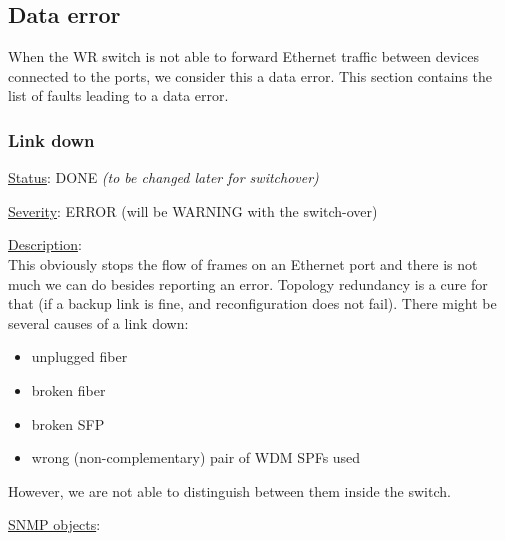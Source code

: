 \newpage
\subsection{Data error}
When the WR switch is not able to forward Ethernet traffic between devices
connected to the ports, we consider this a data error. This section contains the
list of faults leading to a data error.

\subsubsection{\bf Link down}
		\label{fail:data:link_down}
		\begin{pck_descr}
			\item [] \underline{Status}: DONE  \emph{(to be changed later for switchover)}
			\item [] \underline{Severity}: ERROR (will be WARNING with the
				switch-over)
			\item [] \underline{Description}:\\
				This obviously stops the flow of frames on an Ethernet port and there is
				not much we can do besides reporting an error. Topology redundancy is a
				cure for that (if a backup link is fine, and reconfiguration does not
				fail). There might be several causes of a link down:
				\begin{itemize}
					\item unplugged fiber
					\item broken fiber
					\item broken SFP
					\item wrong (non-complementary) pair of WDM SPFs used
				\end{itemize}
				However, we are not able to distinguish between them inside the switch.
			\item [] \underline{SNMP objects}:\\
        {\footnotesize
				\\
				\\
				\\
				\\
         }
		\end{pck_descr}

